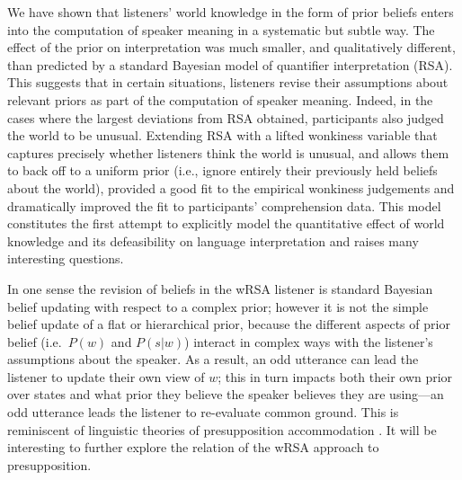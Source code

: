 \documentclass[10pt,letterpaper]{article}
\newcommand{\red}[1]{\textcolor{Red}{#1}}
\begin{document}
We have shown that listeners' world knowledge in the form of prior beliefs enters into the computation of speaker meaning in a systematic but subtle way. The effect of the prior on interpretation was much smaller, and qualitatively different, than predicted by a standard Bayesian model of quantifier interpretation (RSA). 
This suggests that in certain situations, listeners revise their assumptions about relevant priors as part of the computation of speaker meaning. 
Indeed, in the cases where the largest deviations from RSA obtained, participants also judged the world to be unusual.
Extending RSA with a lifted wonkiness variable that captures precisely whether listeners think the world is unusual, and allows them to back off to a uniform prior (i.e., ignore entirely their previously held beliefs about the world), provided a good fit to the empirical wonkiness judgements and dramatically improved the fit to participants' comprehension data. This model constitutes the first attempt to explicitly model the quantitative effect of world knowledge and its defeasibility on language interpretation and raises many interesting questions.

In one sense the revision of beliefs in the wRSA listener is standard Bayesian belief updating with respect to a complex prior; however it is not the simple belief update of a flat or hierarchical prior, because the different aspects of prior belief (i.e.~$P(w)$ and $P(s|w)$) interact in complex ways with the listener's assumptions about the speaker.
As a result, an odd utterance can lead the listener to update their own view of $w$; this in turn impacts both their own prior over states and what prior they believe the speaker believes they are using---an odd utterance leads the listener to re-evaluate common ground. 
This is reminiscent of linguistic theories of presupposition accommodation \cite{lewis1979,stalnaker1973,stalnaker1998}.
It will be interesting to further explore the relation of the wRSA approach to presupposition.
\end{document}
